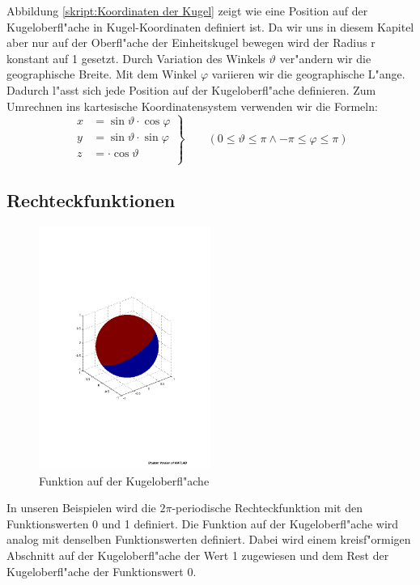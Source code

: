 \begin{refsection}
Abbildung \ref{skript:Koordinaten der Kugel} 
zeigt wie eine Position auf der Kugeloberfl"ache in
Kugel-Koordinaten definiert ist. 
Da wir uns in diesem Kapitel aber nur auf der Oberfl"ache der 
Einheitskugel bewegen wird der Radius r konstant auf 1 gesetzt. 
Durch Variation des Winkels $\vartheta$ ver"andern wir die 
geographische Breite. 
Mit dem Winkel $\varphi$ variieren wir die geographische 
L"ange. 
Dadurch l"asst sich jede Position auf der Kugeloberfl"ache definieren. 
Zum Umrechnen ins kartesische Koordinatensystem verwenden wir die 
Formeln:
\[
\left.\begin{aligned}
x& = \sin\vartheta \cdot \cos\varphi\\
y& = \sin\vartheta \cdot \sin\varphi\\
z& = \cdot \cos\vartheta\\      
\end{aligned}
\right\}
\qquad (0 \leq \vartheta \leq \pi \wedge {-\pi} \leq \varphi \leq \pi)
\]

\subsection{Rechteckfunktionen}
\begin{figure}%
\centering
\includegraphics[width=0.5\textwidth]{kugel/Funktion.pdf}
\caption{Funktion auf der Kugeloberfl"ache
\label{skript:Funktion auf Kugeloberfl"ache}}
\end{figure}
In unseren Beispielen wird die $2\pi$-periodische Rechteckfunktion
mit den Funktionswerten 0 und 1 definiert. 
Die Funktion auf der Kugeloberfl"ache wird analog 
mit denselben Funktionswerten definiert. 
Dabei wird einem kreisf"ormigen Abschnitt auf der Kugeloberfl"ache 
der Wert 1 zugewiesen und dem Rest der Kugeloberfl"ache der 
Funktionswert 0. 


\end{refsection}
